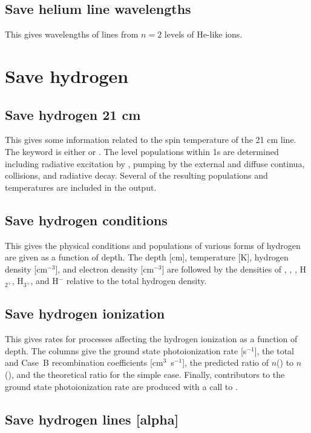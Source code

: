 \subsection{Save helium line wavelengths}

This gives wavelengths of lines from $n=2$ levels of He-like ions.

\section{Save hydrogen}

\subsection{Save hydrogen 21 cm}

This gives some information related to the spin temperature of the 21
cm line.
The keyword is either \cdCommand{21 cm} or \cdCommand{21cm}.
The level populations
within 1s are determined including radiative excitation by \la, pumping by
the external and diffuse continua, collisions, and radiative decay.  Several
of the resulting populations and temperatures are included in the output.

\subsection{Save hydrogen conditions}

This gives the physical conditions and populations of various forms of
hydrogen are given as a function of depth.  The depth [cm], temperature
[K], hydrogen density [cm$^{-3}$], and electron density [cm$^{-3}$] are followed by
the densities of \hO, \hplus, \htwo, H$_{2^{+}}$, H$_{3^{+}}$, and H$^-$ relative to the total hydrogen
density.

\subsection{Save hydrogen ionization}

This gives rates for processes affecting the hydrogen ionization as a
function of depth.  The columns give the ground state photoionization rate
[s$^{-1}$], the total and Case~B recombination coefficients [cm$^3$~s$^{-1}$], the
predicted ratio of $n$(\hplus) to $n$(\hO), and the theoretical ratio for the simple
case.  Finally, contributors to the ground state photoionization rate are
produced with a call to .

\subsection{Save hydrogen lines [alpha]}

